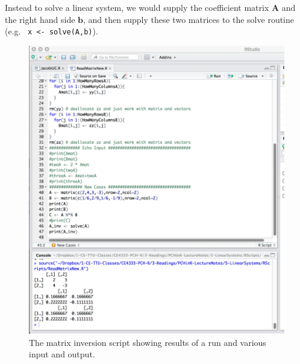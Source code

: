 Instead to solve a linear system, we would supply the coefficient matrix $\mathbf{A}$ and the right hand side $\mathbf{b}$, and then supply these two matrices to the solve routine \\ (e.g.~ \texttt{x <- solve(A,b)}).

\begin{figure}[h!] %
   \centering
   \includegraphics[width=6in]{./5-LinearSystems/InvertedMatrix.jpg} 
   \caption{The matrix inversion script  showing results of a run and various input and output.}
   \label{fig:InvertedMatrix}
\end{figure}
\clearpage


